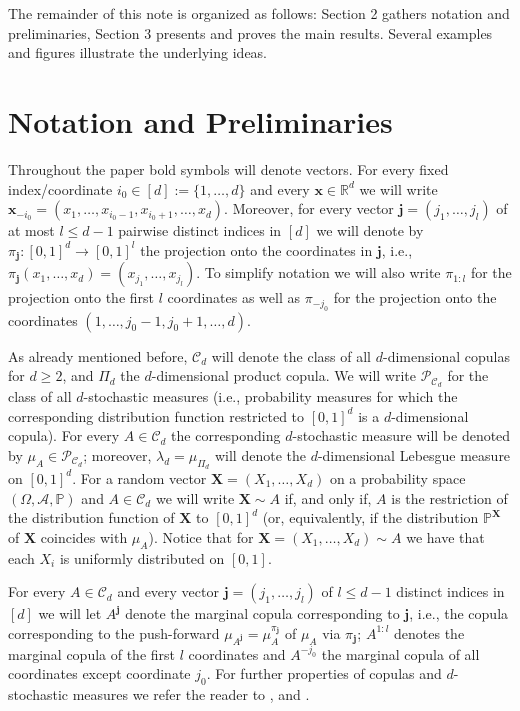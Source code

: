 \documentclass[12pt,a4paper]{amsart}
\theoremstyle{definition}
\newcommand{\kc}{\mathcal{C}}
\begin{document}
The remainder of this note is organized as follows: Section 2 gathers notation and 
preliminaries, Section 3 presents and proves the main results. Several 
examples and figures illustrate the underlying ideas. 

\section{Notation and Preliminaries}\label{sec:2}
Throughout the paper bold symbols will denote vectors. For every fixed 
index/coor\-dinate $i_0 \in [d] := \{1,\ldots,d\}$ and every $\mathbf{x} \in \mathbb{R}^d$ we will write
$\mathbf{x}_{-i_0}=(x_1,\ldots,x_{i_0-1},x_{i_0+1},\ldots,x_d)$. 
Moreover, for every vector $\mathbf{j}=(j_1,\ldots,j_l)$ of at most $l \leq d-1$ pairwise 
distinct indices in $[d]$ we will denote by $\pi_\mathbf{j}: [0,1]^d \rightarrow [0,1]^l$ 
the projection onto the coordinates in $\mathbf{j}$, i.e., 
$\pi_{\mathbf{j}}(x_1,\ldots,x_d)=(x_{j_1},\ldots,x_{j_l})$. 
To simplify notation we will also write $\pi_{1:l}$ for the projection onto the first $l$ coordinates
as well as $\pi_{-j_0}$ for the projection onto the coordinates $(1,\ldots,j_0-1,j_0+1,\ldots,d)$. 

As already mentioned before, $\kc_d$ will denote the class of all $d$-dimensional copulas 
for $d \geq 2$, and $\Pi_d$ the $d$-dimensional product copula. 
We will write $\mathcal{P}_{\mathcal{C}_d}$ for the class of all $d$-stochastic measures
(i.e., probability measures for which the corresponding distribution function restricted to $[0,1]^d$
is a $d$-dimensional copula). For every $A\in \kc_d$ the correspon\-ding $d$-stochastic measure 
will be denoted by $\mu_A \in \mathcal{P}_{\mathcal{C}_d}$; moreover, 
$\lambda_d=\mu_{\Pi_d}$ will denote the $d$-dimensional Lebesgue measure on $[0,1]^d$.   
For a random vector $\mathbf{X}=(X_1,\ldots,X_d)$ on a probability space 
$(\Omega,\mathcal{A},\mathbb{P})$ and $A \in \kc_d$ we will write 
$\mathbf{X}\sim A$ if, and only if, $A$ is the restriction of the distribution function of
$\mathbf{X}$ to $[0,1]^d$ (or, equivalently, if the distribution $\mathbb{P}^\mathbf{X}$ of $\mathbf{X}$ coincides with $\mu_A$). Notice that 
for $\mathbf{X}=(X_1,\ldots,X_d)\sim A$ we have that each $X_i$ is uniformly distributed on $[0,1]$. 

For every $A \in \kc_d$ and every vector $\mathbf{j}=(j_1,\ldots,j_l)$ of $l \le d-1$ distinct indices in $[d]$ we will let $A^\mathbf{j}$ denote the marginal 
copula corresponding to $\mathbf{j}$, i.e., the copula corresponding to the push-forward 
$\mu_{A^\mathbf{j}}=\mu_A^{\pi_{\mathbf{j}}}$ of $\mu_A$ via $\pi_{\mathbf{j}}$; 
$A^{1:l}$ denotes the marginal copula of the first $l$ coordinates and $A^{-j_0}$ the 
marginal copula of all coordinates except coordinate $j_0$.  
For further properties of copulas and $d$-stochastic measures we refer the reader to \cite{DuSe}, and \cite{Nels}. 
\end{document}
